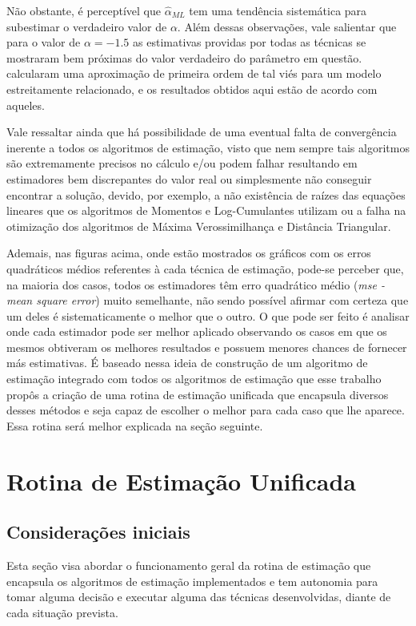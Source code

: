 Não obstante, é perceptível que 
$\widehat{\alpha}_{ML}$ tem uma tendência sistemática para subestimar o verdadeiro valor de $\alpha$. Além dessas observações, vale salientar que para o valor de $\alpha = -1.5$ as estimativas providas por todas as técnicas se mostraram bem próximas do valor verdadeiro do parâmetro em questão. \citet{FreryStochasticDistances2015} calcularam uma aproximação de primeira ordem de tal viés para um modelo estreitamente relacionado, e os resultados obtidos aqui estão de acordo com aqueles.

Vale ressaltar ainda que há possibilidade de uma eventual falta de convergência inerente a todos os algoritmos de estimação, visto que nem sempre tais algoritmos são extremamente precisos no cálculo e/ou podem falhar resultando em estimadores bem discrepantes do valor real ou simplesmente não conseguir encontrar a solução, devido, por exemplo, a não existência de raízes das equações lineares que os algoritmos de Momentos e Log-Cumulantes utilizam ou a falha na otimização dos algoritmos de Máxima Verossimilhança e Distância Triangular.

Ademais, nas figuras acima, onde estão mostrados os gráficos com os erros quadráticos médios referentes à cada técnica de estimação, pode-se perceber que, na maioria dos casos, todos os estimadores têm erro quadrático médio (\textit{mse - mean square error}) muito semelhante, não sendo possível afirmar com certeza que um deles é sistematicamente o melhor que o outro. O que pode ser feito é analisar onde cada estimador pode ser melhor aplicado observando os casos em que os mesmos obtiveram os melhores resultados e possuem menores chances de fornecer más estimativas. É baseado nessa ideia de construção de um algoritmo de estimação integrado com todos os algoritmos de estimação que esse trabalho propôs a criação de uma rotina de estimação unificada que encapsula diversos desses métodos e seja capaz de escolher o melhor para cada caso que lhe aparece. Essa rotina será melhor explicada na seção seguinte.

\section{Rotina de Estimação Unificada}

\subsection{Considerações iniciais}

Esta seção visa abordar o funcionamento geral da rotina de estimação que encapsula os algoritmos de estimação implementados e tem autonomia para tomar alguma decisão e executar alguma das técnicas desenvolvidas, diante de cada situação prevista. 

